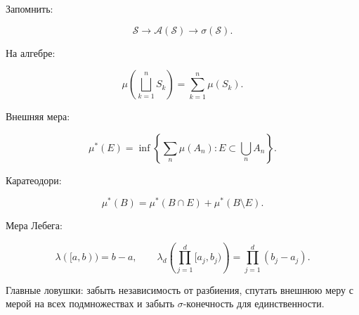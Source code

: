 \documentclass[
  11pt,
  a4paper,
]{article}
\begin{document}
Запомнить:

\[
\mathcal S\to\mathcal A(\mathcal S)\to\sigma(\mathcal S).
\]

На алгебре:

\[
\mu\left(\bigsqcup_{k=1}^nS_k\right)=\sum_{k=1}^n\mu(S_k).
\]

Внешняя мера:

\[
\mu^*(E)=
\inf\left\{
\sum_n\mu(A_n):
E\subset\bigcup_n A_n
\right\}.
\]

Каратеодори:

\[
\mu^*(B)=\mu^*(B\cap E)+\mu^*(B\setminus E).
\]

Мера Лебега:

\[
\lambda([a,b))=b-a,
\qquad
\lambda_d\left(\prod_{j=1}^d[a_j,b_j)\right)
=
\prod_{j=1}^d(b_j-a_j).
\]

Главные ловушки: забыть независимость от разбиения, спутать внешнюю меру
с мерой на всех подмножествах и забыть \(\sigma\)-конечность для
единственности.

\newpage
\end{document}
